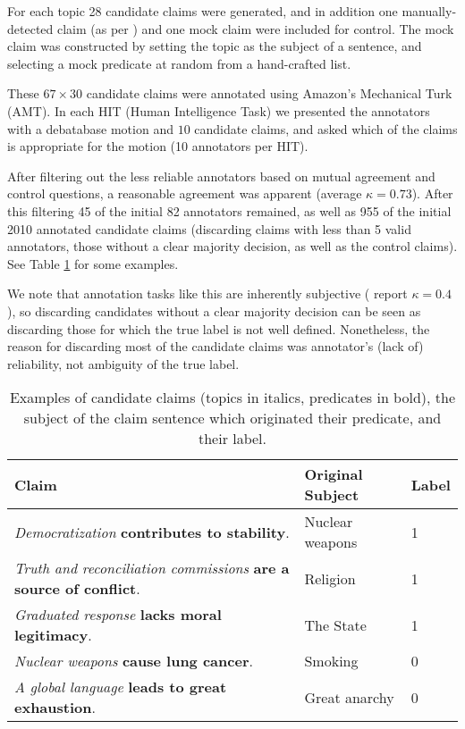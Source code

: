 \documentclass[11pt]{article}
\begin{document}
For each topic 28 candidate claims were generated, and in addition one manually-detected claim (as per \cite{debater}) and one mock claim were included for control. The mock claim was constructed by setting the topic as the subject of a sentence, and selecting a mock predicate at random from a hand-crafted list. 

These $67 \times 30$ %
candidate claims were annotated using Amazon's Mechanical Turk (AMT). %
In each HIT (Human Intelligence Task) we presented the annotators with a debatabase motion and $10$ candidate claims, %
and asked which of the claims is appropriate for the motion %
(10 annotators per HIT).

After filtering out the less reliable annotators based on mutual agreement and control questions, a reasonable agreement was apparent (average $\kappa = 0.73$). After this filtering 45 of the initial 82 annotators remained, as well as 955 of the initial 2010 annotated candidate claims (discarding claims with less than 5 valid annotators, those without a clear majority decision, as well as the control claims). See Table \ref{tab:examples} for some examples.

We note that annotation tasks like this are inherently subjective %
(\cite{debater} report $\kappa = 0.4$), so discarding candidates without a clear majority decision can be seen as discarding those for which the true label is not well defined. Nonetheless, the reason for discarding most of the candidate claims was annotator's (lack of) reliability, not ambiguity of the true label.

\begin{table}
\begin{center}
\begin{tabular}{ |p{4cm}|p{1.9cm}|p{0.8cm}| }
\hline
\textbf{Claim} & \textbf{Original Subject} & \textbf{Label}\\ 
\hline
\textit{Democratization} \textbf{contributes to stability}. & Nuclear weapons & 1\\
\hline
\textit{Truth and reconciliation commissions} \textbf{are a source of conflict}. & Religion & 1\\
\hline
\textit{Graduated response} \textbf{lacks moral legitimacy}. & The State & 1\\
\hline
\textit{Nuclear weapons} \textbf{cause lung cancer}. & Smoking & 0\\
\hline
\textit{A global language} \textbf{leads to great exhaustion}. & Great anarchy & 0\\
\hline
\end{tabular}
\caption {Examples of candidate claims (topics in italics, predicates in bold), the subject of the claim sentence which originated their predicate, and their label. }\label{tab:examples}
\end{center}
\end{table}
\end{document}
